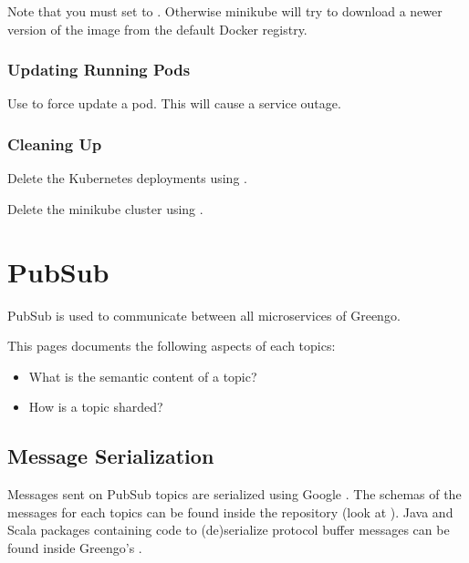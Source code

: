 \documentclass[letterpaper,10pt,english]{sphinxmanual}
\begin{document}
Note that you must set  to .
Otherwise minikube will try to download a newer version of the image from the default Docker registry.


\subsection{Updating Running Pods}
\label{\detokenize{deployments:updating-running-pods}}
Use  to force update a pod.
This will cause a service outage.


\subsection{Cleaning Up}
\label{\detokenize{deployments:cleaning-up}}
Delete the Kubernetes deployments using .

Delete the minikube cluster using .


\chapter{PubSub}
\label{\detokenize{pubsub:pubsub}}\label{\detokenize{pubsub::doc}}
PubSub is used to communicate between all microservices of Greengo.

This pages documents the following aspects of each topics:
\begin{itemize}
\item {} 
What is the semantic content of a topic?

\item {} 
How is a topic sharded?

\end{itemize}


\section{Message Serialization}
\label{\detokenize{pubsub:message-serialization}}
Messages sent on PubSub topics are serialized using Google .
The schemas of the messages for each topics can be found inside the  repository (look at ).
Java and Scala packages containing code to (de)serialize protocol buffer messages can be found inside Greengo’s {\hyperref[\detokenize{private_maven_repo:private-maven-repo}]{}}.
\end{document}
